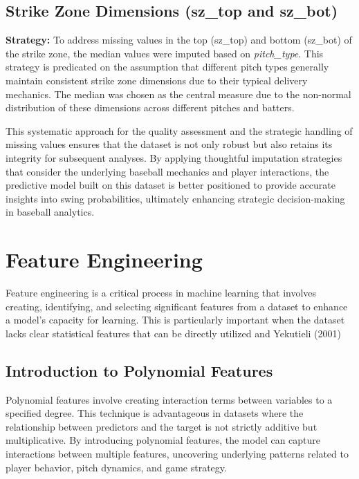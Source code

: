 \documentclass[12pt]{article}
\begin{document}
\subsection*{Strike Zone Dimensions (sz\_top and sz\_bot)}
\textbf{Strategy:} To address missing values in the top (sz\_top) and bottom (sz\_bot) of the strike zone, the median values were imputed based on \textit{pitch\_type}. This strategy is predicated on the assumption that different pitch types generally maintain consistent strike zone dimensions due to their typical delivery mechanics. The median was chosen as the central measure due to the non-normal distribution of these dimensions across different pitches and batters.

This systematic approach for the quality assessment and the strategic handling of missing values ensures that the dataset is not only robust but also retains its integrity for subsequent analyses. By applying thoughtful imputation strategies that consider the underlying baseball mechanics and player interactions, the predictive model built on this dataset is better positioned to provide accurate insights into swing probabilities, ultimately enhancing strategic decision-making in baseball analytics.


\maketitle

\section{Feature Engineering}

Feature engineering is a critical process in machine learning that involves creating, identifying, and selecting significant features from a dataset to enhance a model's capacity for learning. This is particularly important when the dataset lacks clear statistical features that can be directly utilized \cite{BenjaminiHochberg1995} and Yekutieli (2001)

\subsection*{Introduction to Polynomial Features}
Polynomial features involve creating interaction terms between variables to a specified degree. This technique is advantageous in datasets where the relationship between predictors and the target is not strictly additive but multiplicative. By introducing polynomial features, the model can capture interactions between multiple features, uncovering underlying patterns related to player behavior, pitch dynamics, and game strategy.
\end{document}
